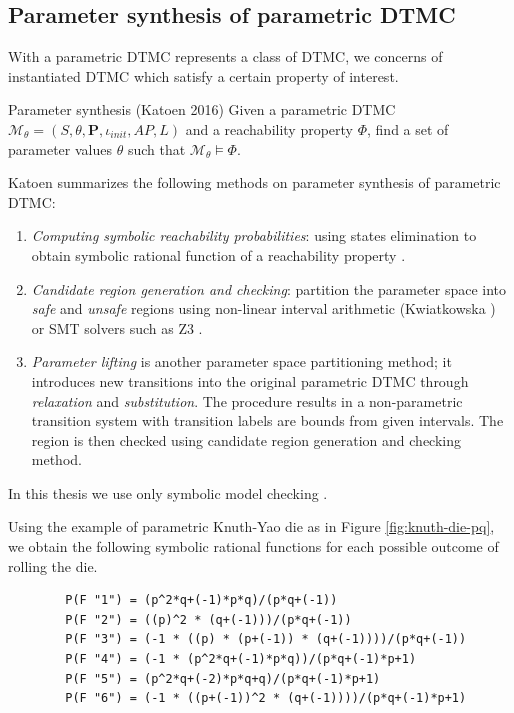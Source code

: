 \subsection{Parameter synthesis of parametric DTMC}
With a parametric DTMC represents a class of DTMC, we concerns of instantiated DTMC which satisfy a certain property of interest.
\begin{definition}{Parameter synthesis (Katoen 2016)\cite{katoen2016probabilistic}} Given a
      parametric DTMC $\mathcal{M}_\theta = (S, \theta, \mathbf{P}, \iota_{init}, AP, L)$ and a
      reachability property $\Phi$, find a set of parameter values $\theta$ such that
      $\mathcal{M}_\theta \models \Phi$.
\end{definition}
Katoen \cite{katoen2013model} summarizes the following methods on parameter synthesis of parametric DTMC:
\begin{enumerate}
      \item \textit{Computing symbolic reachability probabilities}: using states elimination to obtain symbolic
            rational function of a reachability property \cite{daws2004symbolic}
            \cite{hahn2011probabilistic}.
      \item \textit{Candidate region generation and checking}: partition the parameter space into
            \textit{safe} and \textit{unsafe} regions using non-linear interval arithmetic
            (Kwiatkowska \cite{kwiatkowska2006symmetry}) or SMT solvers such as Z3 \cite{de2008z3}.
      \item \textit{Parameter lifting} is another parameter space partitioning method; it introduces
            new transitions into the original parametric DTMC through \textit{relaxation} and
            \textit{substitution}. The procedure results in a non-parametric transition system with
            transition labels are bounds from given intervals. The region is then checked using
            candidate region generation and checking method.
\end{enumerate}
In this thesis we use only symbolic model checking \cite{daws2004symbolic}.
\begin{example}
      Using the example of parametric Knuth-Yao die as in Figure \ref{fig:knuth-die-pq}, we obtain
      the following symbolic rational functions for each possible outcome of rolling the die.
      \begin{lstlisting}
        P(F "1") = (p^2*q+(-1)*p*q)/(p*q+(-1))
        P(F "2") = ((p)^2 * (q+(-1)))/(p*q+(-1))
        P(F "3") = (-1 * ((p) * (p+(-1)) * (q+(-1))))/(p*q+(-1))
        P(F "4") = (-1 * (p^2*q+(-1)*p*q))/(p*q+(-1)*p+1)
        P(F "5") = (p^2*q+(-2)*p*q+q)/(p*q+(-1)*p+1)
        P(F "6") = (-1 * ((p+(-1))^2 * (q+(-1))))/(p*q+(-1)*p+1)
    \end{lstlisting}
\end{example}
